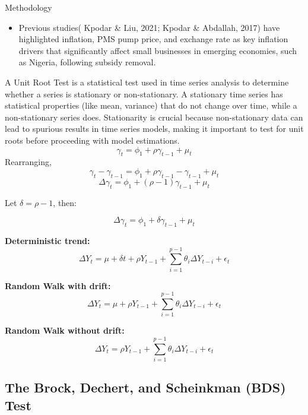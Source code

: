 \documentclass{beamer}
\begin{document}
{\begin{frame} {Methodology}
\begin{itemize}
\item Previous studies( Kpodar \& Liu, 2021; Kpodar \& Abdallah, 2017) have highlighted inflation, PMS pump price, and exchange rate as key inflation drivers that significantly affect small businesses in emerging economies, such as Nigeria, following subsidy removal.
\end{itemize}
\end{frame}
\begin{frame}
 A Unit Root Test is a statistical test used in time series analysis to determine whether a series is stationary or non-stationary. A stationary time series has statistical properties (like mean, variance) that do not change over time, while a non-stationary series does. Stationarity is crucial because non-stationary data can lead to spurious results in time series models, making it important to test for unit roots before proceeding with model estimations.
\begin{equation}
\gamma_t = \phi_1 + \rho \gamma_{t-1} + \mu_t \tag{1}
\end{equation}
Rearranging,
\begin{equation}
\gamma_t - \gamma_{t-1} = \phi_1 + \rho \gamma_{t-1} - \gamma_{t-1} + \mu_t \tag{2}
\end{equation}
\begin{equation}
\Delta \gamma_t = \phi_1 + (\rho - 1) \gamma_{t-1} + \mu_t \tag{3}
\end{equation}

Let \(\delta = \rho - 1\), then:

\begin{equation}
\Delta \gamma_t = \phi_1 + \delta \gamma_{t-1} + \mu_t \tag{4}
\end{equation}
\end{frame}
\begin{frame}
\textbf{Deterministic trend:}
   \[
   \Delta Y_t = \mu + \delta t + \rho Y_{t-1} + \sum_{i=1}^{p-1} \theta_i \Delta Y_{t-i} + \epsilon_t
   \]

 \textbf{Random Walk with drift:}
   \[
   \Delta Y_t = \mu + \rho Y_{t-1} + \sum_{i=1}^{p-1} \theta_i \Delta Y_{t-i} + \epsilon_t
   \]

 \textbf{ Random Walk without drift:}
   \[
   \Delta Y_t = \rho Y_{t-1} + \sum_{i=1}^{p-1} \theta_i \Delta Y_{t-i} + \epsilon_t
   \]
\end{frame}
\begin{frame}
\section*{The Brock, Dechert, and Scheinkman (BDS) Test}


\end{frame}}
\end{document}
